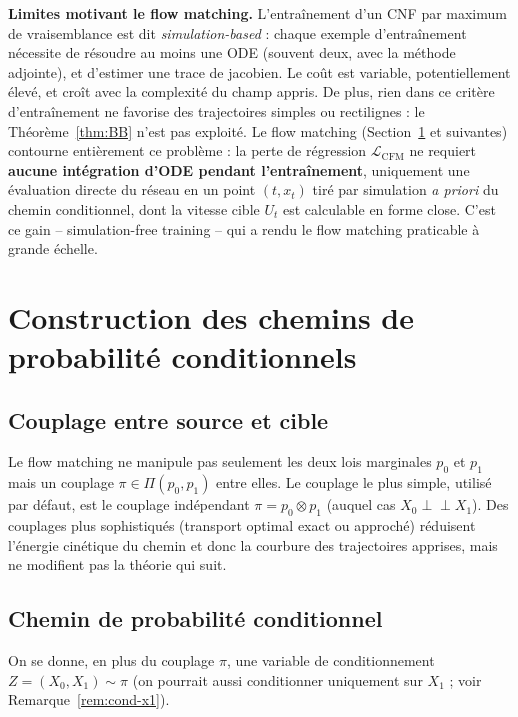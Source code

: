 \documentclass[11pt,a4paper]{article}
\theoremstyle{definition}
\theoremstyle{plain}
\theoremstyle{remark}
\newcommand{\independent}{\perp\!\!\!\perp}
\begin{document}
\begin{warningbox}
\textbf{Limites motivant le flow matching.} L'entraînement d'un CNF par maximum
de vraisemblance est dit \emph{simulation-based} : chaque exemple d'entraînement
nécessite de résoudre au moins une ODE (souvent deux, avec la méthode adjointe),
et d'estimer une trace de jacobien. Le coût est variable, potentiellement élevé,
et croît avec la complexité du champ appris. De plus, rien dans ce critère
d'entraînement ne favorise des trajectoires simples ou rectilignes : le
Théorème~\ref{thm:BB} n'est pas exploité. Le flow matching
(Section~\ref{sec:cfm-construction} et suivantes) contourne entièrement ce
problème : la perte de
régression $\mathcal{L}_{\mathrm{CFM}}$ ne requiert \textbf{aucune intégration
d'ODE pendant l'entraînement}, uniquement une évaluation directe du réseau en un
point $(t,x_t)$ tiré par simulation \emph{a priori} du chemin conditionnel, dont
la vitesse cible $U_t$ est calculable en forme close. C'est ce gain --
\og simulation-free training \fg{} -- qui a rendu le flow matching praticable à
grande échelle.
\end{warningbox}

\section{Construction des chemins de probabilité conditionnels}\label{sec:cfm-construction}

\subsection{Couplage entre source et cible}

Le flow matching ne manipule pas seulement les deux lois marginales $p_0$ et
$p_1$ mais un couplage $\pi\in\Pi(p_0,p_1)$ entre elles. Le couplage le plus
simple, utilisé par défaut, est le couplage indépendant $\pi=p_0\otimes p_1$
(auquel cas $X_0\independent X_1$). Des couplages plus sophistiqués (transport
optimal exact ou approché) réduisent l'énergie cinétique du chemin et donc la
courbure des trajectoires apprises, mais ne modifient pas la théorie qui suit.

\subsection{Chemin de probabilité conditionnel}

On se donne, en plus du couplage $\pi$, une variable de conditionnement
$Z=(X_0,X_1)\sim\pi$ (on pourrait aussi conditionner uniquement sur $X_1$ ; voir
Remarque~\ref{rem:cond-x1}).
\end{document}
